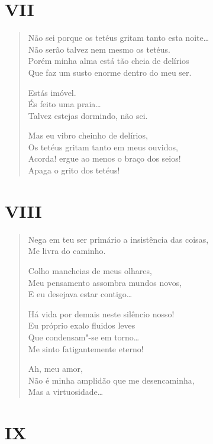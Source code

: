 {\pagebreak
\section*{VII}

\begin{verse}
Não sei porque os tetéus gritam tanto esta noite\ldots{}\\
Não serão talvez nem mesmo os tetéus.\\
Porém minha alma está tão cheia de delírios\\
Que faz um susto enorme dentro do meu ser.

Estás imóvel.\\
És feito uma praia\ldots{}\\
Talvez estejas dormindo, não sei.

Mas eu vibro cheinho de delírios,\\
Os tetéus gritam tanto em meus ouvidos,\\
Acorda! ergue ao menos o braço dos seios!\\
Apaga o grito dos tetéus!
\end{verse}

\pagebreak
\section*{VIII}

\begin{verse}
Nega em teu ser primário a insistência das coisas,\\
Me livra do caminho.

Colho mancheias de meus olhares,\\
Meu pensamento assombra mundos novos,\\
E eu desejava estar contigo\ldots{}

Há vida por demais neste silêncio nosso!\\
Eu próprio exalo fluidos leves\\
Que condensam"-se em torno\ldots{}\\
Me sinto fatigantemente eterno!

Ah, meu amor,\\
Não é minha amplidão que me desencaminha,\\
Mas a virtuosidade\ldots{}
\end{verse}

\pagebreak
\section*{IX}

}
